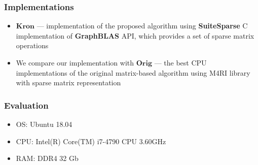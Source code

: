 \documentclass[xcolor=table]{beamer}
\begin{document}
\begin{frame}[fragile] \frametitle{Implementations}

\begin{itemize}
	\item $\textbf{Kron}$ --- implementation of the proposed algorithm using \textbf{SuiteSparse} C implementation of \textbf{GraphBLAS} API, which provides a set of sparse matrix operations
	\pause
	\item We compare our implementation with $\textbf{Orig}$ --- the best CPU implementations of the original matrix-based algorithm using M4RI library with sparse matrix representation
\end{itemize}
\end{frame}

\begin{frame} \frametitle{Evaluation}
\begin{itemize}
	\item OS: Ubuntu 18.04
	\item CPU: Intel(R) Core(TM) i7-4790 CPU 3.60GHz
	\item RAM: DDR4 32 Gb
\end{itemize}
\end{frame}
\end{document}
